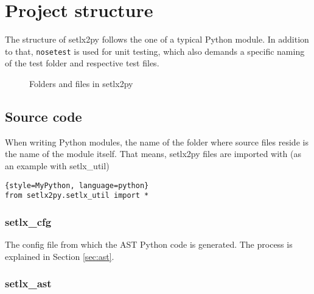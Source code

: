 
\section{Project structure}

The structure of setlx2py follows the one of a typical Python module. In addition to that, \texttt{nosetest} is used for unit testing, which also demands a specific naming of the test folder and respective test files.

\begin{figure}[ht]
\caption{Folders and files in setlx2py}
\end{figure}

%
%
\clearpage
\subsection{Source code}

When writing Python modules, the name of the folder where source files reside is the name of the module itself. That means, setlx2py files are imported with (as an example with setlx\_util)

\begin{lstlisting}{style=MyPython, language=python}
from setlx2py.setlx_util import *
\end{lstlisting}

%
\subsubsection{setlx\_cfg}

The config file from which the AST Python code is generated. The process is explained in Section \ref{sec:ast}.

%
\subsubsection{setlx\_ast}


